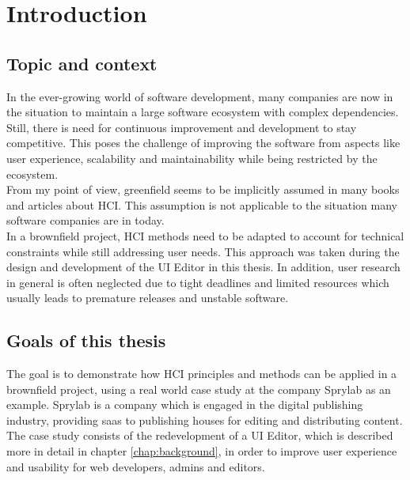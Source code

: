 %
\chapter{Introduction}
\label{chap:introduction}

\section{Topic and context}

In the ever-growing world of software development, many companies are now in the situation to maintain a large software ecosystem with complex dependencies.
Still, there is need for continuous improvement and development to stay competitive.
This poses the challenge of improving the software from aspects like user experience, scalability and maintainability while being restricted by the ecosystem.
\\
From my point of view, \Gls{greenfield} seems to be implicitly assumed in many books and articles about HCI.
This assumption is not applicable to the situation many software companies are in today.
\\
In a brownfield project, HCI methods need to be adapted to account for technical constraints while still addressing user needs. This approach was taken during the design and development of the UI Editor in this thesis.
In addition, user research in general is often neglected due to tight deadlines and limited resources which usually leads to premature releases and unstable software.
\section{Goals of this thesis}
The goal is to demonstrate how HCI principles and methods can be applied in a brownfield project, using a real world case study at the company Sprylab as an example.
Sprylab is a company which is engaged in the digital publishing industry, providing \Gls{saas} to publishing houses for editing and distributing content.
The case study consists of the redevelopment of a UI Editor, which is described more in detail in chapter \ref{chap:background}, in order to improve user experience and usability for web developers, admins and editors.

